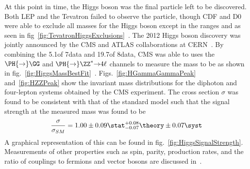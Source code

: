 At this point in time, the Higgs boson was the final particle left to be discovered.
Both LEP and the Tevatron failed to observe the particle, though CDF and D0 were able to exclude all masses for the Higgs boson except in the ranges \gev and \gev as seen in fig~\ref{fig:TevatronHiggsExclusions}~\cite{PhysRevD.88.052014}.
The 2012 Higgs boson discovery was jointly announced by the CMS and ATLAS collaborations at CERN~\cite{201230,20121}.
By combining the 5.1\fbinv of 7\tev data and 19.7\fbinv of 8\tev data, CMS was able to uses the $\PH{\rightarrow}\GG$ and $\PH{\rightarrow}\ZZ^{*}{\rightarrow}4\ell$ channels to measure the mass to be  as shown in fig.~\ref{fig:HiggsMassBestFit}~\cite{Khachatryan2015}.
Figs.~\ref{fig:HGammaGammaPeak} and~\ref{fig:HZZPeak} show the invariant mass distributions for the diphoton and four-lepton systems obtained by the CMS experiment.
The cross section $\sigma$ was found to be consistent with that of the standard model such that the signal strength at the measured mass was found to be
\begin{equation}
\frac{\sigma}{\sigma_{SM}}=\text{1.00}\pm\text{0.09}\stat_{-\text{0.07}}^{+\text{0.08}}\theory\pm\text{0.07}\syst
\end{equation}
A graphical representation of this can be found in fig.~\ref{fig:HiggsSignalStrength}.
Measurements of other properties such as spin, parity, production rates, and the ratio of couplings to fermions and vector bosons are discussed in~\cite{Khachatryan2015}.

